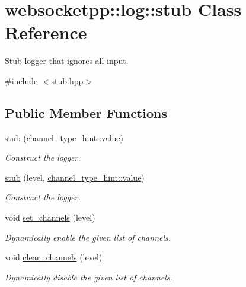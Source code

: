 \hypertarget{classwebsocketpp_1_1log_1_1stub}{}\section{websocketpp\+:\+:log\+:\+:stub Class Reference}
\label{classwebsocketpp_1_1log_1_1stub}


Stub logger that ignores all input.  




{\ttfamily \#include $<$stub.\+hpp$>$}

\subsection*{Public Member Functions}
\begin{DoxyCompactItemize}
\item 
\hyperlink{classwebsocketpp_1_1log_1_1stub_ae28cf7e38cfb64008c4b5b3e90621ad9}{stub} (\hyperlink{structwebsocketpp_1_1log_1_1channel__type__hint_ad12a7f6555b71aabdc4cbec604dc89dd}{channel\+\_\+type\+\_\+hint\+::value})
\begin{DoxyCompactList}\small\item\em Construct the logger. \end{DoxyCompactList}\item 
\hyperlink{classwebsocketpp_1_1log_1_1stub_a45e96ad7f1a562c446645961d8d24784}{stub} (level, \hyperlink{structwebsocketpp_1_1log_1_1channel__type__hint_ad12a7f6555b71aabdc4cbec604dc89dd}{channel\+\_\+type\+\_\+hint\+::value})
\begin{DoxyCompactList}\small\item\em Construct the logger. \end{DoxyCompactList}\item 
void \hyperlink{classwebsocketpp_1_1log_1_1stub_acdaf1728646e2477cf7243b13f71e18d}{set\+\_\+channels} (level)
\begin{DoxyCompactList}\small\item\em Dynamically enable the given list of channels. \end{DoxyCompactList}\item 
void \hyperlink{classwebsocketpp_1_1log_1_1stub_af4bea37fd436439b0ab19238b2c47d15}{clear\+\_\+channels} (level)
\begin{DoxyCompactList}\small\item\em Dynamically disable the given list of channels. \end{DoxyCompactList}\item 

\end{DoxyCompactItemize}
